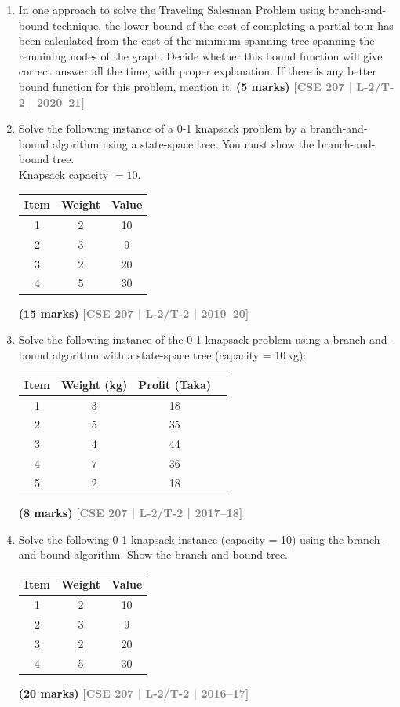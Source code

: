 \documentclass[12pt]{article}
\newcommand{\yr}[1]{\hfill\textcolor{gray}{\small\textbf{[#1]}}}
\newcommand{\mk}[1]{\textcolor{orange!70!black}{\small\textbf{(#1 marks)}}}
\begin{document}
\begin{enumerate}
Find the optimal tour using branch and bound, and pruning techniques combined.
\mk{20} \yr{CSE 207 | L-2/T-2 | 2021--22}


\item In one approach to solve the Traveling Salesman Problem using branch-and-bound technique, the lower bound of the cost of completing a partial tour has been calculated from the cost of the minimum spanning tree spanning the remaining nodes of the graph. Decide whether this bound function will give correct answer all the time, with proper explanation. If there is any better bound function for this problem, mention it.
\mk{5} \yr{CSE 207 | L-2/T-2 | 2020--21}


\item Solve the following instance of a 0-1 knapsack problem by a branch-and-bound algorithm using a state-space tree. You must show the branch-and-bound tree.\\[4pt]
Knapsack capacity $= 10$.
\begin{center}
\begin{tabular}{|c|c|c|}
\hline
\textbf{Item} & \textbf{Weight} & \textbf{Value} \\
\hline
1 & 2 & 10 \\
2 & 3 & 9  \\
3 & 2 & 20 \\
4 & 5 & 30 \\
\hline
\end{tabular}
\end{center}
\mk{15} \yr{CSE 207 | L-2/T-2 | 2019--20}


 \item Solve the following instance of the 0-1 knapsack problem using a branch-and-bound algorithm with a state-space tree (capacity = 10\,kg):
\begin{center}
\begin{tabular}{cccc}
\toprule
Item & Weight (kg) & Profit (Taka) \\
\midrule
1 & 3 & 18 \\
2 & 5 & 35 \\
3 & 4 & 44 \\
4 & 7 & 36 \\
5 & 2 & 18 \\
\bottomrule
\end{tabular}
\end{center}
\mk{8}
\yr{CSE 207 | L-2/T-2 | 2017--18}


\item Solve the following 0-1 knapsack instance (capacity = 10) using the branch-and-bound algorithm. Show the branch-and-bound tree.
\begin{center}
\begin{tabular}{ccc}
\toprule
Item & Weight & Value \\
\midrule
1 & 2 & 10 \\
2 & 3 & 9 \\
3 & 2 & 20 \\
4 & 5 & 30 \\
\bottomrule
\end{tabular}
\end{center}
\mk{20}
\yr{CSE 207 | L-2/T-2 | 2016--17}



\end{enumerate}
\end{document}
